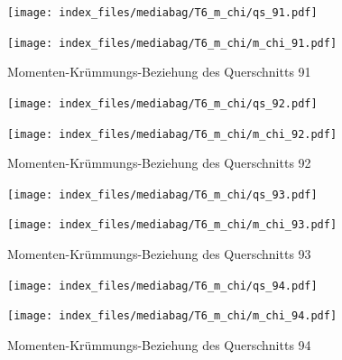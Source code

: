 \documentclass[
  11pt,
  letterpaper,
]{scrreprt}
\begin{document}
\begin{figure}[H]

\begin{minipage}{0.50\linewidth}
\texttt{[image: index\_files/mediabag/T6\_m\_chi/qs\_91.pdf]}\end{minipage}%
%
\begin{minipage}{0.50\linewidth}
\texttt{[image: index\_files/mediabag/T6\_m\_chi/m\_chi\_91.pdf]}\end{minipage}%

\caption{\label{fig-m_chi_appendix}Momenten-Krümmungs-Beziehung des
Querschnitts 91}

\end{figure}%

\begin{figure}[H]

\begin{minipage}{0.50\linewidth}
\texttt{[image: index\_files/mediabag/T6\_m\_chi/qs\_92.pdf]}\end{minipage}%
%
\begin{minipage}{0.50\linewidth}
\texttt{[image: index\_files/mediabag/T6\_m\_chi/m\_chi\_92.pdf]}\end{minipage}%

\caption{\label{fig-m_chi_appendix}Momenten-Krümmungs-Beziehung des
Querschnitts 92}

\end{figure}%

\begin{figure}[H]

\begin{minipage}{0.50\linewidth}
\texttt{[image: index\_files/mediabag/T6\_m\_chi/qs\_93.pdf]}\end{minipage}%
%
\begin{minipage}{0.50\linewidth}
\texttt{[image: index\_files/mediabag/T6\_m\_chi/m\_chi\_93.pdf]}\end{minipage}%

\caption{\label{fig-m_chi_appendix}Momenten-Krümmungs-Beziehung des
Querschnitts 93}

\end{figure}%

\begin{figure}[H]

\begin{minipage}{0.50\linewidth}
\texttt{[image: index\_files/mediabag/T6\_m\_chi/qs\_94.pdf]}\end{minipage}%
%
\begin{minipage}{0.50\linewidth}
\texttt{[image: index\_files/mediabag/T6\_m\_chi/m\_chi\_94.pdf]}\end{minipage}%

\caption{\label{fig-m_chi_appendix}Momenten-Krümmungs-Beziehung des
Querschnitts 94}

\end{figure}%
\end{document}
